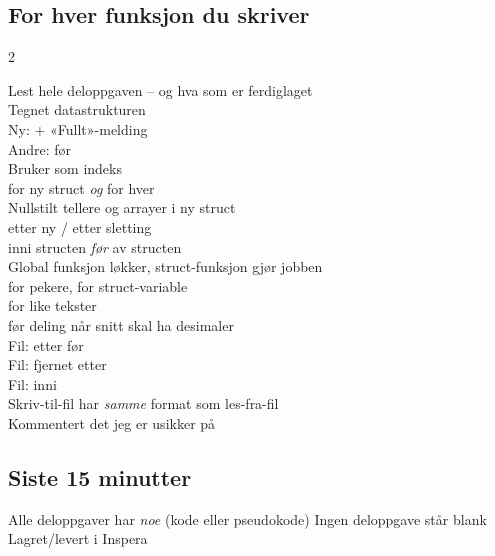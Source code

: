 
\label{kap:sjekk2}

\subsection*{For hver funksjon du skriver}
\begin{multicols}{2}\raggedright
\boks Lest hele deloppgaven -- og hva som er ferdiglaget\\
\boks Tegnet datastrukturen\\
\boks Ny:  + «Fullt»-melding\\
\boks Andre:  før \\
\boks Bruker  som indeks\\
\boks {} for ny struct \emph{og} for hver \\
\boks Nullstilt tellere og arrayer i ny struct\\
\boks {} etter ny /  etter sletting\\
\boks {} inni structen \emph{før}  av structen\\
\columnbreak
\boks Global funksjon løkker, struct-funksjon gjør jobben\\
\boks \cc{->} for pekere,  for struct-variable\\
\boks {} for like tekster\\
\boks {} før deling når snitt skal ha desimaler\\
\boks Fil:  etter  før \\
\boks Fil: fjernet  etter \\
\boks Fil:  inni \\
\boks Skriv-til-fil har \emph{samme} format som les-fra-fil\\
\boks Kommentert det jeg er usikker på
\end{multicols}

\subsection*{Siste 15 minutter}
\boks Alle deloppgaver har \emph{noe} (kode eller pseudokode) \quad \boks Ingen deloppgave står blank\\
\boks Lagret/levert i Inspera
